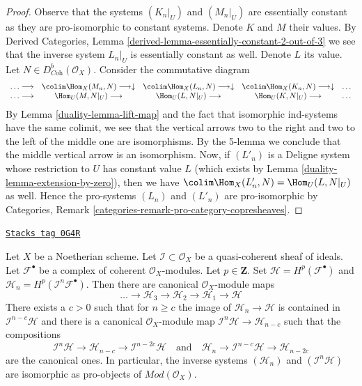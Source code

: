\begin{proof}

Observe that the systems $(K_n|_U)$ and $(M_n|_U)$ are essentially constant
as they are pro-isomorphic to constant systems.
Denote $K$ and $M$ their values. By Derived Categories, Lemma
\ref{derived-lemma-essentially-constant-2-out-of-3}
we see that the inverse system $L_n|_U$ is essentially constant as well.
Denote $L$ its value.
Let $N \in D^b_{\textit{Coh}}(\mathcal{O}_X)$. Consider the commutative
diagram
$$
\begin{array}{ccccc}\ldots \longrightarrow & \colim \Hom_X(M_n, N) \longrightarrow\downarrow & \colim \Hom_X(L_n, N) \longrightarrow\downarrow & \colim \Hom_X(K_n, N) \longrightarrow\downarrow & \ldots \\ \ldots \longrightarrow & \Hom_U(M, N|_U) \longrightarrow & \Hom_U(L, N|_U) \longrightarrow & \Hom_U(K, N|_U) \longrightarrow & \ldots\end{array}
$$
By Lemma \ref{duality-lemma-lift-map} and the fact that isomorphic ind-systems
have the same colimit, we see that the vertical arrows two to the right
and two to the left of the middle one are isomorphisms. By the 5-lemma
we conclude that the
middle vertical arrow is an isomorphism. Now, if $(L'_n)$ is a Deligne system
whose restriction to $U$ has constant value $L$ (which
exists by Lemma \ref{duality-lemma-extension-by-zero}), then
we have $\colim \Hom_X(L'_n, N) = \Hom_U(L, N|_U)$ as well.
Hence the pro-systems $(L_n)$ and $(L'_n)$ are
pro-isomorphic by
Categories, Remark \ref{categories-remark-pro-category-copresheaves}.
\end{proof}

\begin{lemma}
\label{duality-lemma-consequence-Artin-Rees-bis}
\href{https://stacks.math.columbia.edu/tag/0G4R}{\texttt{Stacks tag 0G4R}}

Let $X$ be a Noetherian scheme. Let $\mathcal{I} \subset \mathcal{O}_X$
be a quasi-coherent sheaf of ideals. Let $\mathcal{F}^\bullet$ be a
complex of coherent $\mathcal{O}_X$-modules. Let $p \in \mathbf{Z}$.
Set $\mathcal{H} = H^p(\mathcal{F}^\bullet)$ and
$\mathcal{H}_n = H^p(\mathcal{I}^n\mathcal{F}^\bullet)$.
Then there are canonical $\mathcal{O}_X$-module maps
$$
\ldots \to \mathcal{H}_3 \to \mathcal{H}_2 \to \mathcal{H}_1 \to \mathcal{H}
$$
There exists a $c > 0$ such that for $n \geq c$ the image of
$\mathcal{H}_n \to \mathcal{H}$ is contained in
$\mathcal{I}^{n - c}\mathcal{H}$ and there is a canonical
$\mathcal{O}_X$-module map
$\mathcal{I}^n\mathcal{H} \to \mathcal{H}_{n - c}$ such that the compositions
$$
\mathcal{I}^n \mathcal{H} \to \mathcal{H}_{n - c} \to
\mathcal{I}^{n - 2c}\mathcal{H}
\quad\text{and}\quad
\mathcal{H}_n \to \mathcal{I}^{n - c}\mathcal{H} \to \mathcal{H}_{n - 2c}
$$
are the canonical ones. In particular, the inverse systems
$(\mathcal{H}_n)$ and $(\mathcal{I}^n\mathcal{H})$
are isomorphic as pro-objects of $\textit{Mod}(\mathcal{O}_X)$.
\end{lemma}

